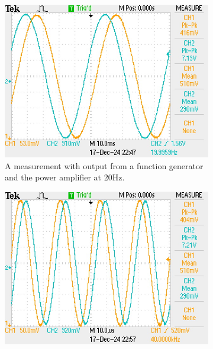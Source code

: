

\begin{figure}[H]
\centering
\captionsetup{justification=raggedright, labelfont=bf}
\begin{subfigure}{.5\textwidth}
  \centering
    \includegraphics[width=0.95\linewidth]{TU Delft Booming Bass Project Report/figures/PowerAmplifier/measurements/20Hz.JPG}
    \captionsetup{justification=raggedright, labelfont=bf}
    \caption{A measurement with output from a function generator and the power amplifier at 20Hz.}
    \label{fig:20Hz}
\end{subfigure}%
\begin{subfigure}{.5\textwidth}
  \centering
    \includegraphics[width=0.95\linewidth]{TU Delft Booming Bass Project Report/figures/PowerAmplifier/measurements/40kHz.JPG}

\end{subfigure}
\end{figure}
